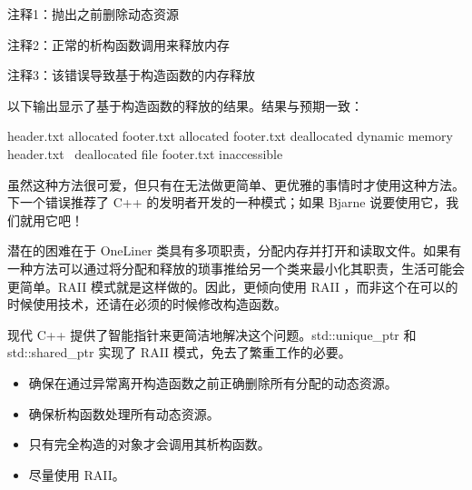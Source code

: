 {\footnotesize
注释1：抛出之前删除动态资源

注释2：正常的析构函数调用来释放内存

注释3：该错误导致基于构造函数的内存释放
}

以下输出显示了基于构造函数的释放的结果。结果与预期一致：

\begin{shell}
header.txt allocated
footer.txt allocated
footer.txt deallocated dynamic memory
header.txt ~deallocated
file footer.txt inaccessible
\end{shell}

虽然这种方法很可爱，但只有在无法做更简单、更优雅的事情时才使用这种方法。下一个错误推荐了 C++ 的发明者开发的一种模式；如果 Bjarne 说要使用它，我们就用它吧！

潜在的困难在于 OneLiner 类具有多项职责，分配内存并打开和读取文件。如果有一种方法可以通过将分配和释放的琐事推给另一个类来最小化其职责，生活可能会更简单。RAII 模式就是这样做的。因此，更倾向使用 RAII ，而非这个在可以的时候使用技术，还请在必须的时候修改构造函数。

现代 C++ 提供了智能指针来更简洁地解决这个问题。std::unique\_ptr 和 std::shared\_ptr 实现了 RAII 模式，免去了繁重工作的必要。


\begin{itemize}
\item
确保在通过异常离开构造函数之前正确删除所有分配的动态资源。

\item
确保析构函数处理所有动态资源。

\item
只有完全构造的对象才会调用其析构函数。

\item
尽量使用 RAII。
\end{itemize}













